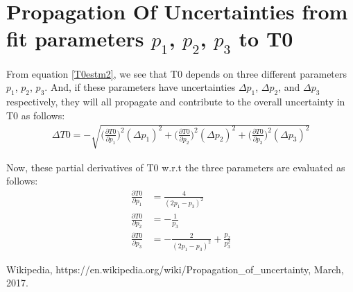 \documentclass[12pt,epsfig]{article}
\begin{document}
\section{Propagation Of Uncertainties from fit parameters $p_1$, $p_2$, $p_3$ to T0}
From equation \ref{T0estm2}, we see that T0 depends on three different parameters $p_1$, $p_2$, $p_3$. And, if these parameters have
uncertainties $\Delta p_1$, $\Delta p_2$, and $\Delta p_3$ respectively, they will all propagate\cite{wikiErrProp} and contribute to the overall uncertainty in T0 as follows:
\begin{equation}
\label{apT0err}
\begin{aligned}
  \Delta T0    =  - \sqrt{\Big(\frac{\partial T0}{\partial p_1} \Big)^2 (\Delta p_1)^2
    +  \Big(\frac{\partial T0}{\partial p_2} \Big)^2 (\Delta p_2)^2
    +  \Big(\frac{\partial T0}{\partial p_3} \Big)^2 (\Delta p_3)^2}
\end{aligned}
\end{equation}

Now, these partial derivatives of T0 w.r.t the three parameters are evaluated as follows:
\begin{equation}
\label{dT0BydP123}
\begin{aligned}
  \frac{\partial T0}{\partial p_1} & =  \frac{4}{  (2p_1 - p_3)^2}  \\
  \frac{\partial T0}{\partial p_2} & =  -\frac{ 1}{ p_3} \\
  \frac{\partial T0}{\partial p_3} & =  -\frac{ 2}{ (2p_1 - p_3)^2} + \frac{ p_2}{ p^2_3}
\end{aligned}
\end{equation}





\begin{thebibliography}{9}
   Wikipedia, https://en.wikipedia.org/wiki/Propagation\_of\_uncertainty, March, 2017.
\end{thebibliography}
\end{document}
